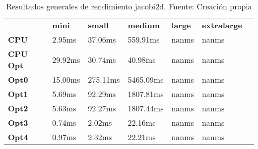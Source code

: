 \begin{table}[H]
    \centering
    \begin{tabular}{lllllll}
    \rowcolor[HTML]{DAE8FC} \ &  \textbf{mini} &  \textbf{small} &  \textbf{medium} &  \textbf{	large} &  \textbf{	extralarge} \\
    \cellcolor[HTML]{DAE8FC} \textbf{CPU} & 2.95ms & 37.06ms & 559.91ms & 	nanms & 	nanms \\
    \rowcolor[HTML]{EFEFEF} \cellcolor[HTML]{DAE8FC} \textbf{CPU Opt} & 29.92ms & 30.74ms & 40.98ms & 	nanms & 	nanms \\
    \cellcolor[HTML]{DAE8FC} \textbf{Opt0} & 15.00ms & 275.11ms & 5465.09ms & 	nanms & 	nanms \\
    \rowcolor[HTML]{EFEFEF} \cellcolor[HTML]{DAE8FC} \textbf{Opt1} & 5.69ms & 92.29ms & 1807.81ms & 	nanms & 	nanms \\
    \cellcolor[HTML]{DAE8FC} \textbf{Opt2} & 5.63ms & 92.27ms & 1807.44ms & 	nanms & 	nanms \\
    \rowcolor[HTML]{EFEFEF} \cellcolor[HTML]{DAE8FC} \textbf{Opt3} & 0.74ms & 2.02ms & 22.16ms & 	nanms & 	nanms \\
    \cellcolor[HTML]{DAE8FC} \textbf{Opt4} & 0.97ms & 2.32ms & 22.21ms & 	nanms & 	nanms \\
    \end{tabular}
    \caption[Resultados generales de rendimiento jacobi2d]{{Resultados generales de rendimiento jacobi2d. Fuente: Creación propia}}
    \label{table_global_jacobi2d_PerformanceResults_data}
\end{table}